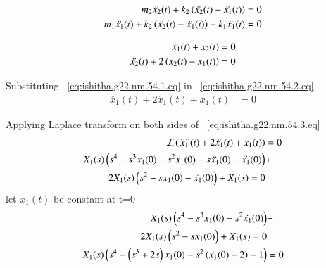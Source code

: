 \documentclass[journal,12pt,twocolumn]{IEEEtran}
\theoremstyle{remark}
\begin{document}
\begin{align}
m_2\ddot{x_2}(t) + k_2\left(\ddot{x_2}(t)-\ddot{x_1}(t)\right)&=0 \\
m_1\ddot{x_1}(t) + k_2\left(\ddot{x_2}(t)-\ddot{x_1}(t)\right)+ k_1\ddot{x_1}(t)&=0
\end{align}

\begin{align}
\ddot{x_1}(t) + x_2(t) &=0 
\label{eq:ishitha.g22.nm.54.1.eq}\\
\ddot{x_2}(t) + 2\left(x_2(t)-x_1(t)\right) &= 0 
\label{eq:ishitha.g22.nm.54.2.eq}
\end{align}

Substituting  ~\eqref{eq:ishitha.g22.nm.54.1.eq} in  ~\eqref{eq:ishitha.g22.nm.54.2.eq}
\begin{align}
\ddddot{x_1}(t) + 2\ddot{x_1}(t) + x_1(t) &= 0 
\label{eq:ishitha.g22.nm.54.3.eq}
\end{align}

Applying Laplace transform on both sides of ~\eqref{eq:ishitha.g22.nm.54.3.eq}
\begin{align}
\mathcal{L}\left(\ddddot{x_1}(t) + 2\ddot{x_1}(t) + x_1(t)\right) &= 0 \\
X_1(s)\left(s^4 - s^3 x_1(0) - s^2 \dot{x_1}(0) -s\ddot{x_1}(0)-\dddot{x_1}(0)\right) &+\nonumber \\ 2X_1(s)\left(s^2-sx_1(0)-\dot{x_1}(0)\right) + X_1(s) =0
\end{align}
let $x_1(t)$ be constant at t=0
\begin{align}
X_1(s)\left(s^4 - s^3 x_1(0) - s^2 \dot{x_1}(0)\right) &+\nonumber \\ 2X_1(s)\left(s^2-sx_1(0)\right) + X_1(s) =0\\
X_1(s)\left(s^4 -\left(s^3+2s\right)x_1(0) - s^2 \left(\dot{x_1}(0)-2\right)  +1\right)&=0
\end{align}
\end{document}
